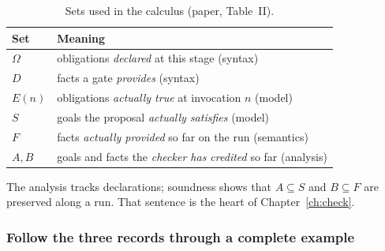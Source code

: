 \begin{table}[h]
\caption{Sets used in the calculus (paper, Table~II).}
\centering
\footnotesize
\renewcommand{\arraystretch}{1.2}
\begin{tabularx}{\textwidth}{@{}lX@{}}
\toprule
\textbf{Set} & \textbf{Meaning}\\
\midrule
$\Omega$ & obligations \emph{declared} at this stage (syntax)\\
$D$ & facts a gate \emph{provides} (syntax)\\
$E(n)$ & obligations \emph{actually true} at invocation $n$ (model)\\
$S$ & goals the proposal \emph{actually satisfies} (model)\\
$F$ & facts \emph{actually provided} so far on the run (semantics)\\
$A,B$ & goals and facts the \emph{checker has credited} so far (analysis)\\
\bottomrule
\end{tabularx}
\end{table}

The analysis tracks declarations; soundness shows that $A\subseteq S$ and $B\subseteq F$ are preserved along a run. That sentence is the heart of Chapter~\ref{ch:check}.

\subsubsection{Follow the three records through a complete example}
\label{sec:accounting-example}

